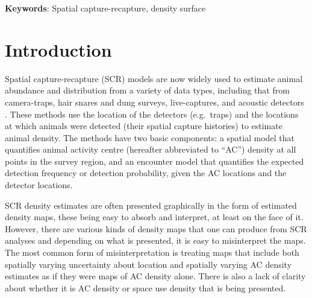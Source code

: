 \documentclass[10pt,a4paper]{article}
\begin{document}
\textbf{Keywords}: Spatial capture-recapture, density surface

\section{Introduction}

Spatial capture-recapture (SCR) models \citep*{Efford:04,Borchers+Efford:08, Royle+Young:08} are now widely used to estimate animal abundance and distribution from a variety of data types, including that from camera-traps, hair snares and dung surveys, live-captures, and acoustic detectors%
. These methods use the location of the detectors (e.g.\ traps) and the locations at which animals were detected (their spatial capture histories) to estimate animal density. The methods have two basic components: a spatial model that quantifies animal activity centre (hereafter abbreviated to ``AC'') density at all points in the survey region, and an encounter model that quantifies the expected detection frequency or detection probability, given the AC locations and the detector locations. 

SCR density estimates are often presented graphically in the form of estimated density maps, these being easy to absorb and interpret, at least on the face of it.  However, there are various kinds of density maps that one can produce from SCR analyses and depending on what is presented, it is easy to misinterpret the maps. The most common form of misinterpretation is treating maps that include both spatially varying uncertainty about location and spatially varying AC density estimates as if they were maps of AC density alone. There is also a lack of clarity about whether it is AC density or space use density that is being presented.

\end{document}
